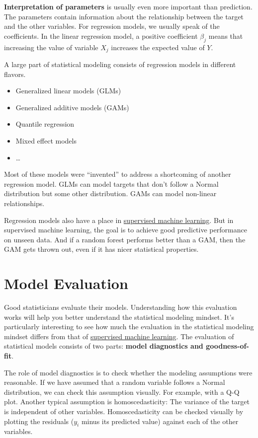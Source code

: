 \documentclass[
  10pt,
]{scrbook}
\providecommand{\tightlist}{%
  \setlength{\itemsep}{0pt}\setlength{\parskip}{0pt}}
\begin{document}
\textbf{Interpretation of parameters} is usually even more important than prediction.
The parameters contain information about the relationship between the target and the other variables.
For regression models, we usually speak of the coefficients.
In the linear regression model, a positive coefficient \(\beta_j\) means that increasing the value of variable \(X_j\) increases the expected value of \(Y\).

A large part of statistical modeling consists of regression models in different flavors.

\begin{itemize}
\tightlist
\item
  Generalized linear models (GLMs)
\item
  Generalized additive models (GAMs)
\item
  Quantile regression
\item
  Mixed effect models
\item
  \ldots{}
\end{itemize}

Most of these models were ``invented'' to address a shortcoming of another regression model.
GLMs can model targets that don't follow a Normal distribution but some other distribution.
GAMs can model non-linear relationships.

Regression models also have a place in \protect\hyperlink{supervised-ml}{supervised machine learning}.
But in supervised machine learning, the goal is to achieve good predictive performance on unseen data.
And if a random forest performs better than a GAM, then the GAM gets thrown out, even if it has nicer statistical properties.

\hypertarget{model-evaluation}{%
\section{Model Evaluation}\label{model-evaluation}}

Good statisticians evaluate their models.
Understanding how this evaluation works will help you better understand the statistical modeling mindset.
It's particularly interesting to see how much the evaluation in the statistical modeling mindset differs from that of \protect\hyperlink{supervised-ml}{supervised machine learning}.
The evaluation of statistical models consists of two parts: \textbf{model diagnostics and goodness-of-fit}.

The role of model diagnostics is to check whether the modeling assumptions were reasonable.
If we have assumed that a random variable follows a Normal distribution, we can check this assumption visually.
For example, with a Q-Q plot.
Another typical assumption is homoscedasticity: The variance of the target is independent of other variables.
Homoscedasticity can be checked visually by plotting the residuals (\(y_i\) minus its predicted value) against each of the other variables.
\end{document}
